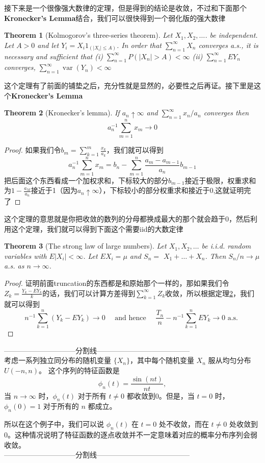 \documentclass{article}
\newtheorem{theorem}{Theorem}[section]
\newtheorem*{proof}{Proof}
\begin{document}
接下来是一个很像强大数律的定理，但是得到的结论是收敛，不过和下面那个\textbf{Kronecker's Lemma}结合，我们可以很快得到一个弱化版的强大数律
\begin{theorem}[Kolmogorov's three-series theorem]
	  Let $X_1, X_2, \ldots$. be independent. Let $A>0$ and let $Y_i=X_i 1_{\left(\left|X_i\right| \leq A\right)}$. In order that $\sum_{n=1}^{\infty} X_n$ converges a.s., it is necessary and sufficient that
	(i) $\sum_{n=1}^{\infty} P\left(\left|X_n\right|>A\right)<\infty$
	(ii) $\sum_{n=1}^{\infty} E Y_n$ converges, $\sum_{n=1}^{\infty} \operatorname{var}\left(Y_n\right)<\infty$
\end{theorem}
这个定理有了前面的铺垫之后，充分性就是显然的，必要性之后再证。接下里是这个\textbf{Kronecker's Lemma}
\begin{theorem}[Kronecker's lemma]
	\label{kronecker}
  If $a_n \uparrow \infty$ and $\sum_{n=1}^{\infty} x_n / a_n$ converges then
	$$
	a_n^{-1} \sum_{m=1}^n x_m \rightarrow 0
	$$
\end{theorem}
\begin{proof}
	如果我们令$b_m=\sum_{k=1}^{m}\frac{x_k}{a_k}$，我们就可以得到
	$$a_n^{-1}\sum_{m=1}^{n}x_m=b_n-\sum_{m=1}^{n}\frac{a_m-a_{m-1}}{a_n}b_{m-1}$$
	把后面这个东西看成一个加权求和，下标较大的部分$b_{m-1}$接近于极限，权重求和为$1-\frac{a_M}{a_n}$接近于1（因为$a_n\uparrow \infty$），下标较小的部分权重求和接近于0,这就证明完了
\end{proof}
这个定理的意思就是你把收敛的数列的分母都换成最大的那个就会趋于0，然后利用这个定理，我们就可以得到下面这个需要iid的大数定律
\begin{theorem}[The strong law of large numbers]
  Let $X_1, X_2, \ldots$ be i.i.d. random variables with $E\left|X_i\right|<\infty$. Let $E X_i=\mu$ and $S_n=$ $X_1+\ldots+X_n$. Then $S_n / n \rightarrow \mu$ a.s. as $n \rightarrow \infty$.
\end{theorem}
\begin{proof}
	证明前面truncation的东西都是和原始那个一样的，那如果我们令$Z_k=\frac{Y_k-EY_k}{k}$的话，我们可以计算方差得到$\sum_{k=1}^{\infty}Z_k$收敛，所以根据定理\ref{kronecker}，我们就可以得到
	$$
	n^{-1} \sum_{k=1}^n\left(Y_k-E Y_k\right) \rightarrow 0 \quad \text { and hence } \quad \frac{T_n}{n}-n^{-1} \sum_{k=1}^n E Y_k \rightarrow 0 \text { a.s. }
	$$
\end{proof}
——————————分割线—————————————\\
考虑一系列独立同分布的随机变量 $\{X_n\}$，其中每个随机变量 $X_n$ 服从均匀分布 $U(-n, n)$。
这个序列的特征函数是
\[
\phi_n(t) = \frac{\sin(nt)}{nt},
\]
当 $n \to \infty$ 时，$\phi_n(t)$ 对于所有 $t \neq 0$ 都收敛到0。但是，当 $t = 0$ 时，$\phi_n(0) = 1$ 对于所有的 $n$ 都成立。

所以在这个例子中，我们可以说 $\phi_n(t)$ 在 $t = 0$ 处不收敛，而在 $t \neq 0$ 处收敛到0。这种情况说明了特征函数的逐点收敛并不一定意味着对应的概率分布序列会弱收敛。\\
——————————分割线—————————————
\end{document}
